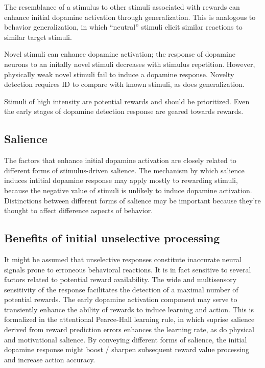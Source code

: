 \documentclass{article}
\numberwithin{equation}{section}
\begin{document}
The resemblance of a stimulus to other stimuli associated with rewards can enhance initial dopamine activation through generalization. This is analogous to behavior generalization, in which ``neutral'' stimuli elicit similar reactions to similar target stimuli.

Novel stimuli can enhance dopamine activation; the response of dopamine neurons to an initally novel stimuli decreases with stimulus repetition. However, physically weak novel stimuli fail to induce a dopamine response. Novelty detection requires ID to compare with known stimuli, as does generalization.

Stimuli of high intensity are potential rewards and should be prioritized. Even the early stages of dopamine detection response are geared towards rewards.

\subsection{Salience}

The factors that enhance initial dopamine activation are closely related to different forms of stimulus-driven salience. The mechanism by which salience induces intitial dopamine response may apply mostly to rewarding stimuli, because the negative value of stimuli is unlikely to induce dopamine activation. Distinctions between different forms of salience may be important because they're thought to affect difference aspects of behavior. 

\subsection{Benefits of initial unselective processing}

It might be assumed that unselective responses constitute inaccurate neural signals prone to erroneous behavioral reactions. It is in fact sensitive to several factors related to potential reward availability. The wide and multisensory sensitivity of the response facilitates the detection of a maximal number of potential rewards. The early dopamine activation component may serve to transiently enhance the ability of rewards to induce learning and action. This is formalized in the attentional Pearce-Hall learning rule, in which suprise salience derived from reward prediction errors enhances the learning rate, as do physical and motivational salience. By conveying different forms of salience, the initial dopamine response might boost / sharpen subsequent reward value processing and increase action accuracy.
\end{document}
